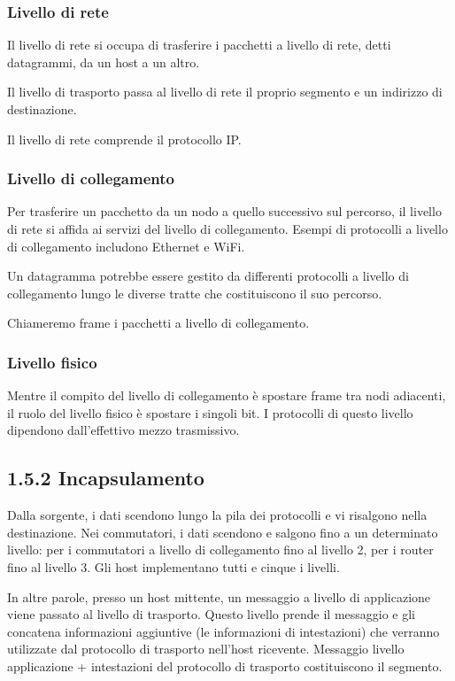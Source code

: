 \documentclass{book}
\begin{document}
\subsubsection{Livello di rete}
Il livello di rete si occupa di trasferire i pacchetti a livello di rete, detti datagrammi, da un host a un altro.

Il livello di trasporto passa al livello di rete il proprio segmento e un indirizzo di destinazione.

Il livello di rete comprende il protocollo IP.


\subsubsection{Livello di collegamento}
Per trasferire un pacchetto da un nodo a quello successivo sul percorso, il livello di rete si affida ai servizi del livello di collegamento. Esempi di protocolli a livello di collegamento includono Ethernet e WiFi.

Un datagramma potrebbe essere gestito da differenti protocolli a livello di collegamento lungo le diverse tratte che costituiscono il suo percorso.

Chiameremo frame i pacchetti a livello di collegamento.

\subsubsection{Livello fisico}
Mentre il compito del livello di collegamento è spostare frame tra nodi adiacenti, il ruolo del livello fisico è spostare i singoli bit. I protocolli di questo livello dipendono dall'effettivo mezzo trasmissivo.

\subsection*{1.5.2 Incapsulamento}
Dalla sorgente, i dati scendono lungo la pila dei protocolli e vi risalgono nella destinazione. Nei commutatori, i dati scendono e salgono fino a un determinato livello: per i commutatori a livello di collegamento fino al livello 2, per i router fino al livello 3. Gli host implementano tutti e cinque i livelli.

In altre parole, presso un host mittente, un messaggio a livello di applicazione viene passato al livello di trasporto. Questo livello prende il messaggio e gli concatena informazioni aggiuntive (le informazioni di intestazioni) che verranno utilizzate dal protocollo di trasporto nell'host ricevente. Messaggio livello applicazione + intestazioni del protocollo di trasporto costituiscono il segmento.
\end{document}
